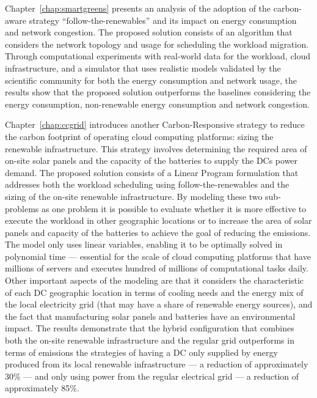 Chapter~\ref{chap:smartgreens} presents an analysis of the adoption of the carbon-aware strategy ``follow-the-renewables'' and its impact on energy consumption and network congestion. The proposed solution consists of an algorithm that considers the network topology and usage for scheduling the workload migration. Through computational experiments with real-world data for the workload, cloud infrastructure, and a simulator that uses realistic models validated by the scientific community for both the energy consumption and network usage, the results show that the proposed solution outperforms the baselines considering the energy consumption, non-renewable energy consumption and network congestion. 

Chapter~\ref{chap:ccgrid} introduces another Carbon-Responsive strategy to reduce the carbon footprint of operating cloud computing platforms: sizing the renewable infrastructure. This strategy involves determining the required area of on-site solar panels and the capacity of the batteries to supply the DCs power demand. The proposed solution consists of a Linear Program formulation that addresses both the workload scheduling using follow-the-renewables and the sizing of the on-site renewable infrastructure. By modeling these two sub-problems as one problem it is possible to evaluate whether it is more effective to execute the workload in other geographic locations or to increase the area of solar panels and capacity of the batteries to achieve the goal of reducing the  emissions. The model only uses linear variables, enabling it to be optimally solved in polynomial time --- essential for the scale of cloud computing platforms that have millions of servers and executes hundred of millions of computational tasks daily. Other important aspects of the modeling are that it considers the characteristic of each DC geographic location in terms of cooling needs and the energy mix of the local electricity grid (that may have a share of renewable energy sources), and the fact that manufacturing solar panels and batteries have an environmental impact. The results demonstrate that the hybrid configuration that combines both the on-site renewable infrastructure and the regular grid outperforms in terms of  emissions the strategies of having a DC only supplied by energy produced from its local renewable infrastructure --- a reduction of approximately 30\% --- and only using power from the regular electrical grid --- a reduction of approximately 85\%.

